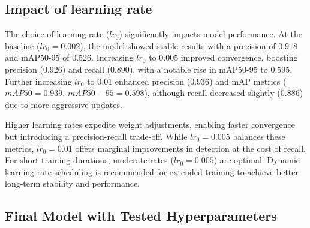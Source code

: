 \documentclass[conference]{IEEEtran}
\begin{document}
\subsection{Impact of learning rate}


\begin{table}[htbp]
    \centering
    \caption{Comparison of YOLOv8m Performance with Different Initial Learning Rates (\(lr_0\))}
    \label{tab:lr_comparison}
\end{table}

The choice of learning rate (\(lr_0\)) significantly impacts model performance. At the baseline (\(lr_0=0.002\)), the model showed stable results with a precision of \(0.918\) and mAP50-95 of \(0.526\). Increasing \(lr_0\) to \(0.005\) improved convergence, boosting precision (\(0.926\)) and recall (\(0.890\)), with a notable rise in mAP50-95 to \(0.595\). Further increasing \(lr_0\) to \(0.01\) enhanced precision (\(0.936\)) and mAP metrics (\(mAP50=0.939\), \(mAP50-95=0.598\)), although recall decreased slightly (\(0.886\)) due to more aggressive updates.

Higher learning rates expedite weight adjustments, enabling faster convergence but introducing a precision-recall trade-off. While \(lr_0=0.005\) balances these metrics, \(lr_0=0.01\) offers marginal improvements in detection at the cost of recall. For short training durations, moderate rates (\(lr_0=0.005\)) are optimal. Dynamic learning rate scheduling is recommended for extended training to achieve better long-term stability and performance.


\subsection{Final Model with Tested Hyperparameters}
\end{document}
